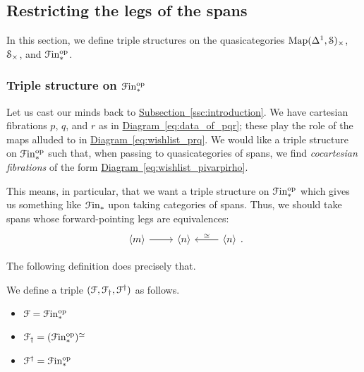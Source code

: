 \documentclass[main.tex]{subfiles}
\begin{document}
\subsection{Restricting the legs of the spans}
\label{ssc:restricting_the_legs_of_the_spans}

In this section, we define triple structures on the quasicategories $\Map(\Delta^{1}, \S)_{\times}$, $\S_{\times}$, and $\Finp\op$.

\subsubsection*{Triple structure on \texorpdfstring{$\Finp\op$}{Fin.op}}

Let us cast our minds back to \hyperref[ssc:introduction]{Subsection~\ref*{ssc:introduction}}. We have cartesian fibrations $p$, $q$, and $r$ as in \hyperref[eq:data_of_pqr]{Diagram~\ref*{eq:data_of_pqr}}; these play the role of the maps alluded to in \hyperref[eq:wishlist_prq]{Diagram~\ref*{eq:wishlist_prq}}. We would like a triple structure on $\Finp\op$ such that, when passing to quasicategories of spans, we find \emph{cocartesian fibrations} of the form \hyperref[eq:wishlist_pivarpirho]{Diagram~\ref*{eq:wishlist_pivarpirho}}.

This means, in particular, that we want a triple structure on $\Finp\op$ which gives us something like $\Finp$ upon taking categories of spans. Thus, we should take spans whose forward-pointing legs are equivalences:
\begin{equation*}
  \begin{tikzcd}
    \langle m \rangle
    \arrow[r]
    & \langle n \rangle
    & \langle n \rangle
    \arrow[l, swap, "\simeq"]
  \end{tikzcd}.
\end{equation*}

The following definition does precisely that.

\begin{definition}
  We define a triple $\triple{F}$ as follows.
  \begin{itemize}
    \item $\mathcal{F} = \Finp\op$

    \item $\mathcal{F}\downdag = (\Finp\op)^{\simeq}$

    \item $\mathcal{F}\updag = \Finp\op$
  \end{itemize}
\end{definition}
\end{document}

